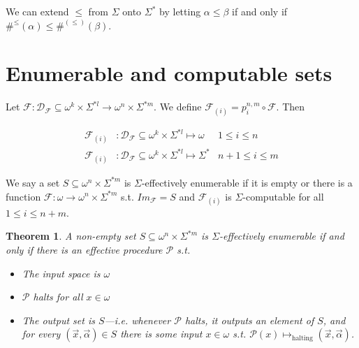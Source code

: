 \documentclass[a4paper, 12pt]{article}
\newtheorem{theorem}{Theorem}
\newtheorem{theorem}{Theorem}
\begin{document}
We can extend $\leq$ from $\Sigma$ onto $\Sigma^{*}$ by letting $\alpha \leq
\beta $ if and only if $\#^{\leq}(\alpha) \leq \#^{(\leq)}(\beta )$.

\pagebreak


\section{Enumerable and computable sets}

Let $\mathcal{F} : \mathcal{D}_{\mathcal{F}} \subseteq \omega^{k} \times \Sigma^{*l} \to \omega^n
\times \Sigma^{*m}$. We define $\mathcal{F}_{(i)} = p_i^{n, m} \circ
\mathcal{F}$. Then

\begin{align*}
    \mathcal{F}_{(i)} &: \mathcal{D}_{\mathcal{F}} \subseteq \omega^{k} \times
    \Sigma^{*l}  \mapsto \omega & 1 \leq i \leq n\\
    \mathcal{F}_{(i)} &: \mathcal{D}_{\mathcal{F}} \subseteq \omega^{k} \times
    \Sigma^{*l} \mapsto  \Sigma^{*} & n + 1 \leq i \leq m
\end{align*}

We say a set $S \subseteq \omega^n \times \Sigma^{*m} $ is $\Sigma$-effectively
enumerable  if it is empty or there is a function $\mathcal{F} : \omega \to
\omega^n \times \Sigma^{*m}$ s.t. $Im_{\mathcal{F}} = S$ and $\mathcal{F}_{(i)}$
is $\Sigma$-computable for all $1 \leq i \leq n + m$.

\begin{theorem}
    A non-empty set $S \subseteq \omega^n \times \Sigma^{*m}$ is
    $\Sigma$-effectively enumerable if and only if there is an effective
    procedure $\mathcal{P}$ s.t. 

    \begin{itemize}
        \item The input space is $\omega$
        \item $\mathcal{P}$ halts for all $x \in \omega$ 
        \item The output set is $S$---i.e. whenever $\mathcal{P}$ halts, it
            outputs an element of $S$, and for every $(\overrightarrow{x},
            \overrightarrow{\alpha}) \in S$ there is some input $x \in \omega$
        s.t. $\mathcal{P}(x) \mapsto_{\text{halting}} (\overrightarrow{x},
        \overrightarrow{\alpha})$.
    \end{itemize}
\end{theorem}
\end{document}
